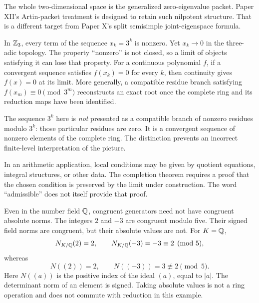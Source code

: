 The whole two-dimensional space is the generalized zero-eigenvalue packet. Paper XII's Artin-packet treatment is designed to retain such nilpotent structure. That is a different target from Paper X's split semisimple joint-eigenspace formula.

In $\mathbb Z_3$, every term of the sequence $x_k=3^k$ is nonzero. Yet $x_k\to0$ in the three-adic topology. The property ``nonzero'' is not closed, so a limit of objects satisfying it can lose that property.
For a continuous polynomial $f$, if a convergent sequence satisfies $f(x_k)=0$ for every $k$, then continuity gives $f(x)=0$ at its limit. More generally, a compatible residue branch satisfying $f(x_m)\equiv0\pmod{3^m}$ reconstructs an exact root once the complete ring and its reduction maps have been identified.

The sequence $3^k$ here is \emph{not} presented as a compatible branch of nonzero residues modulo $3^k$: those particular residues are zero. It is a convergent sequence of nonzero elements of the complete ring. The distinction prevents an incorrect finite-level interpretation of the picture.

In an arithmetic application, local conditions may be given by quotient equations, integral structures, or other data. The completion theorem requires a proof that the chosen condition is preserved by the limit under construction. The word ``admissible'' does not itself provide that proof.

Even in the number field $\mathbb Q$, congruent generators need not have congruent absolute norms. The integers $2$ and $-3$ are congruent modulo five. Their signed field norms are congruent, but their absolute values are not.
For $K=\mathbb Q$,
\[
N_{K/\mathbb Q}(2)=2,\qquad N_{K/\mathbb Q}(-3)=-3\equiv2\pmod5,
\]
whereas
\[
N((2))=2,\qquad N((-3))=3\not\equiv2\pmod5.
\]
Here $N((a))$ is the positive index of the ideal $(a)$, equal to $|a|$. The determinant norm of an element is signed. Taking absolute values is not a ring operation and does not commute with reduction in this example.

